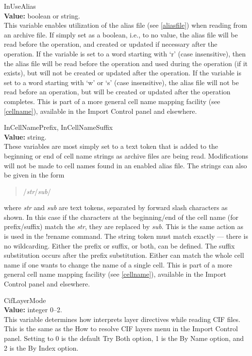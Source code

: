 \begin{description}
\item{\et InUseAlias}\\
{\bf Value:} boolean or string.\\
This variable enables utilization of the alias file (see
\ref{aliasfile}) when reading from an archive file.  If simply set as
a boolean, i.e., to no value, the alias file will be read before the
operation, and created or updated if necessary after the operation. 
If the variable is set to a word starting with `{\vt r}' (case
insensitive), then the alias file will be read before the operation
and used during the operation (if it exists), but will not be created
or updated after the operation.  If the variable is set to a word
starting with `{\vt w}' or `{\vt s}' (case insensitive), the alias
file will not be read before an operation, but will be created or
updated after the operation completes.  This is part of a more general
cell name mapping facility (see \ref{cellname}), available in the {\cb
Import Control} panel and elsewhere.

\item{{\et InCellNamePrefix}, {\et InCellNameSuffix}}\\
{\bf Value:} string.\\
These variables are most simply set to a text token that is added to
the beginning or end of cell name strings as archive files are being
read.  Modifications will not be made to cell names found in an
enabled alias file.  The strings can also be given in the form
\begin{quote}
/{\it str\/}/{\it sub\/}/
\end{quote}
where {\it str} and {\it sub} are text tokens, separated by forward
slash characters as shown.  In this case if the characters at the
beginning/end of the cell name (for prefix/suffix) match the {\it
str}, they are replaced by {\it sub}.  This is the same action as is
used in the {\cb !rename} command.  The string token must match
exactly --- there is no wildcarding.  Either the prefix or suffix, or
both, can be defined.  The suffix substitution occurs after the prefix
substitution.  Either can match the whole cell name if one wants to
change the name of a single cell.  This is part of a more general cell
name mapping facility (see \ref{cellname}), available in the {\cb
Import Control} panel and elsewhere.

\item{\et CifLayerMode}\\
{\bf Value:} integer 0--2.\\
This variable determines how {\Xic} interprets layer directives while
reading CIF files.  This is the same as the {\cb How to resolve CIF
layers} menu in the {\cb Import Control} panel.  Setting to 0 is the
default {\cb Try Both} option, 1 is the {\cb By Name} option, and 2 is
the {\cb By Index} option.


\end{description}
